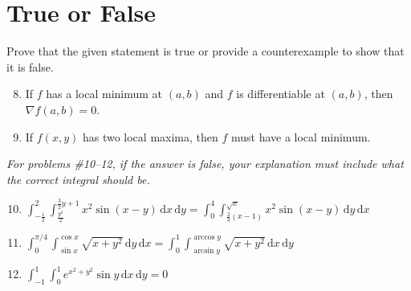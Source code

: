\documentclass[11pt]{article}
\begin{document}
\section*{True or False}
Prove that the given statement is true or provide a counterexample to show that it is false.

\begin{enumerate}
  \setcounter{enumi}{7}

\item If \(f\) has a local minimum at \((a,b)\) and \(f\) is differentiable at
  \((a,b)\), then \(\nabla f (a,b) = 0\).

\item If \( f(x,y) \) has two local maxima, then \( f \) must have a local minimum.
\end{enumerate}

\textit{For problems \#10--12, if the answer is false, your explanation must include what the correct integral should be.}

\begin{enumerate}
  \setcounter{enumi}{9}
  
\item
  \(\int_{-\frac{1}{2}}^{2} \int_{\frac{y^2}{2}}^{\frac{3}{2}y+1} x^2 \sin(x-y)
  \,\mathrm{d}x\,\mathrm{d}y= \int_0^4 \int_{\frac{2}{3}(x-1)}^{\sqrt{x}} x^2
  \sin(x-y) \, \mathrm{d}y \, \mathrm{d}x\)

\item
  \(\int_0^{\pi/4} \int_{\sin x}^{\cos x} \sqrt{x + y^2} \, \mathrm{d}y\,
  \mathrm{d}x= \int_0^1 \int_{\arcsin y}^{\arccos y} \sqrt{x + y^2} \,
  \mathrm{d}x\, \mathrm{d}y\)

\item
  \(\int_{-1}^{1} \int_{0}^{1} e^{x^2 + y^2} \sin y \, \mathrm{d}x\,
  \mathrm{d}y= 0\)
\end{enumerate}
\end{document}
